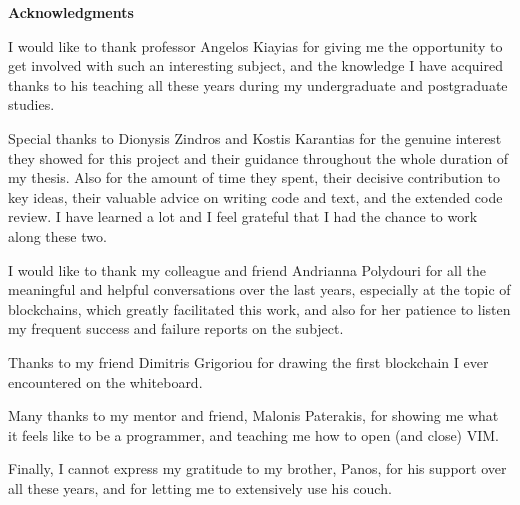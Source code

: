 \newpage
\begin{center}
\Large{\textbf{Acknowledgments}}
\end{center}

I would like to thank professor Angelos Kiayias for giving me the opportunity
to get involved with such an interesting subject, and the knowledge I have
acquired thanks to his teaching all these years during my undergraduate and
postgraduate studies.

Special thanks to Dionysis Zindros and Kostis Karantias for the genuine
interest they showed for this project and their guidance throughout the whole
duration of my thesis. Also for the amount of time they spent, their decisive
contribution to key ideas, their valuable advice on writing code and text, and
the extended code review. I have learned a lot and I feel grateful that I had
the chance to work along these two.

I would like to thank my colleague and friend Andrianna Polydouri for all the
meaningful and helpful conversations over the last years, especially at the
topic of blockchains, which greatly facilitated this work, and also for her
patience to listen my frequent success and failure reports on the subject.

Thanks to my friend Dimitris Grigoriou for drawing the first blockchain I ever
encountered on the whiteboard.

Many thanks to my mentor and friend, Malonis Paterakis, for showing me
what it feels like to be a programmer, and teaching me how to open (and close)
VIM.

Finally, I cannot express my gratitude to my brother, Panos, for his support
over all these years, and for letting me to extensively use his couch.
